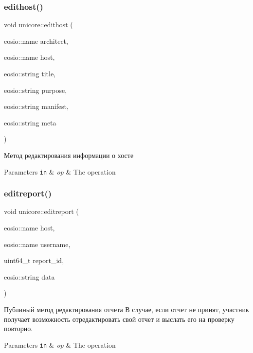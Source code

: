\subsubsection{\texorpdfstring{edithost()}{edithost()}}
{\footnotesize\ttfamily void unicore\+::edithost (\begin{DoxyParamCaption}\item[{eosio\+::name}]{architect,  }\item[{eosio\+::name}]{host,  }\item[{eosio\+::string}]{title,  }\item[{eosio\+::string}]{purpose,  }\item[{eosio\+::string}]{manifest,  }\item[{eosio\+::string}]{meta }\end{DoxyParamCaption})}



Метод редактирования информации о хосте 


\begin{DoxyParams}[1]{Parameters}
\mbox{\tt in}  & {\em op} & The operation \\
\hline
\end{DoxyParams}
\mbox{\label{classunicore_ad041a75ade13b77f67f54c99f7ca7d29}} 
\subsubsection{\texorpdfstring{editreport()}{editreport()}}
{\footnotesize\ttfamily void unicore\+::editreport (\begin{DoxyParamCaption}\item[{eosio\+::name}]{host,  }\item[{eosio\+::name}]{username,  }\item[{uint64\+\_\+t}]{report\+\_\+id,  }\item[{eosio\+::string}]{data }\end{DoxyParamCaption})}



Публиный метод редактирования отчета В случае, если отчет не принят, участник получает возможность отредактировать свой отчет и выслать его на проверку повторно. 


\begin{DoxyParams}[1]{Parameters}
\mbox{\tt in}  & {\em op} & The operation \\
\hline
\end{DoxyParams}
\mbox{\label{classunicore_a415141b20af92120acd7a752d646b1fa}} 
